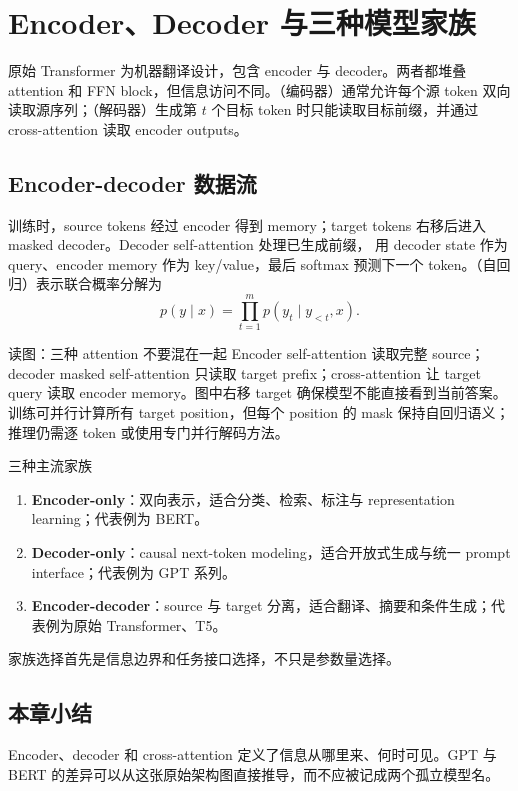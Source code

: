 \section{Encoder、Decoder 与三种模型家族}

原始 Transformer 为机器翻译设计，包含 encoder 与 decoder。两者都堆叠 attention 和 FFN block，但信息访问不同。（编码器）通常允许每个源 token 双向读取源序列；（解码器）生成第 $t$ 个目标 token 时只能读取目标前缀，并通过 cross-attention 读取 encoder outputs。

\subsection{Encoder-decoder 数据流}

训练时，source tokens 经过 encoder 得到 memory；target tokens 右移后进入 masked decoder。Decoder self-attention 处理已生成前缀， 用 decoder state 作为 query、encoder memory 作为 key/value，最后 softmax 预测下一个 token。（自回归）表示联合概率分解为
\[
p(y\mid x)=\prod_{t=1}^{m}p(y_t\mid y_{<t},x).
\]


\begin{knowledgebox}{读图：三种 attention 不要混在一起}
Encoder self-attention 读取完整 source；decoder masked self-attention 只读取 target prefix；cross-attention 让 target query 读取 encoder memory。图中右移 target 确保模型不能直接看到当前答案。训练可并行计算所有 target position，但每个 position 的 mask 保持自回归语义；推理仍需逐 token 或使用专门并行解码方法。
\end{knowledgebox}

\begin{importantbox}{三种主流家族}
\begin{enumerate}
  \item \textbf{Encoder-only}：双向表示，适合分类、检索、标注与 representation learning；代表例为 BERT。
  \item \textbf{Decoder-only}：causal next-token modeling，适合开放式生成与统一 prompt interface；代表例为 GPT 系列。
  \item \textbf{Encoder-decoder}：source 与 target 分离，适合翻译、摘要和条件生成；代表例为原始 Transformer、T5。
\end{enumerate}
家族选择首先是信息边界和任务接口选择，不只是参数量选择。
\end{importantbox}

\subsection{本章小结}

Encoder、decoder 和 cross-attention 定义了信息从哪里来、何时可见。GPT 与 BERT 的差异可以从这张原始架构图直接推导，而不应被记成两个孤立模型名。

